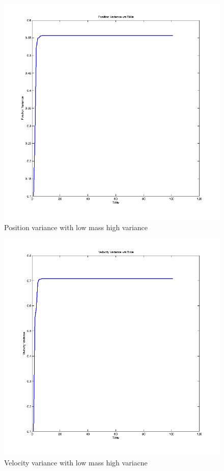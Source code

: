 \documentclass[12pt,english]{article}
\begin{document}
\begin{figure}
    \includegraphics[width=\linewidth]{kalman-variance1-m1h}
    \caption{Position variance with low mass high variance}
\end{figure}

\begin{figure}
    \includegraphics[width=\linewidth]{kalman-variance2-m1h}
    \caption{Velocity variance with low mass high variacne}
\end{figure}
\end{document}
